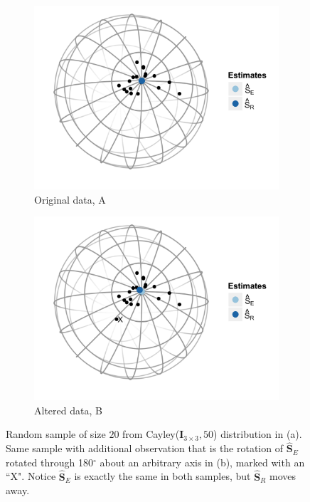 \documentclass{article}\usepackage[]{graphicx}\usepackage[]{color}
\newcommand{\ProjMean}{{\widehat{\bm S}_{E}}}
\newcommand{\GeomMean}{{\widehat{\bm S}_{R}}}
\begin{document}
\begin{figure}
\centering
\begin{subfigure}[b]{0.45\textwidth}
  \centering
  \includegraphics[width=\textwidth]{Figure/Sample1}
  \caption{Original data, A}
  \label{fig:samp1}
\end{subfigure}
\begin{subfigure}[b]{0.45\textwidth}
  \centering
  \includegraphics[width=\textwidth]{Figure/Sample2}
  \caption{Altered data, B}
  \label{fig:samp2}
\end{subfigure}
\caption{Random sample of size $20$ from Cayley($\bm I_{3\times 3},50$) distribution in (a).  Same sample with additional observation that is the rotation of $\ProjMean$ rotated through 180$^\circ$ about an arbitrary axis in (b), marked with an ``X".  Notice $\ProjMean$ is exactly the same in both samples, but $\GeomMean$ moves away.}
\label{fig:sample}
\end{figure}
\clearpage
\end{document}
